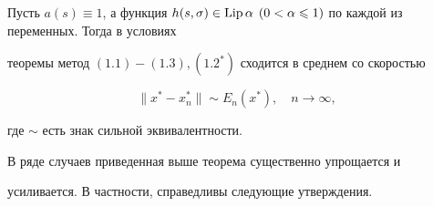 \begin{cornonum}


Пусть $a(s)\equiv 1$, а функция $h(s,\si)\in \Lip


\alpha$ $(0<\alpha\lea 1)$ по каждой из переменных. Тогда в условиях


теоремы метод $(1.1)-(1.3), (1.2^*)$ сходится в среднем со скоростью


\begin{equation}


\|x^*-x_n^*\|\sim E_n(x^*),\quad n\to \infty,


\tag{$1.4'$}


\end{equation}


где $\sim$ есть знак сильной эквивалентности.


\end{cornonum}





В ряде случаев приведенная выше теорема существенно упрощается и


усиливается. В частности, справедливы следующие утверждения.





